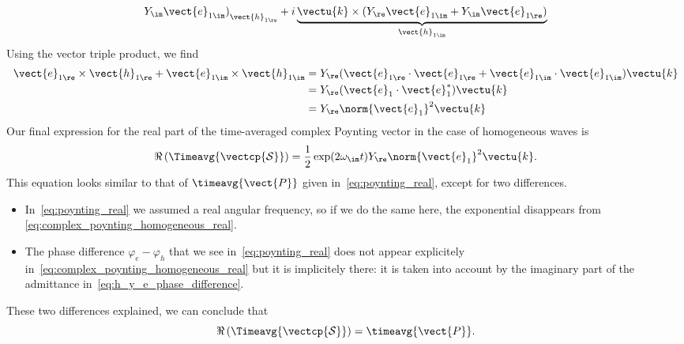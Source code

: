 \begin{refsection}
\begin{equation}
{                 Y_\im \vect{e}_{1\im})
               }_{\vect{h}_{1\re}}
    +i
    \underbrace{\vectu{k} \times
                (Y_\re \vect{e}_{1\im} +
                 Y_\im \vect{e}_{1\re})
               }_{\vect{h}_{1\im}}
    \label{eq:h_y_e_phase_difference}
\end{equation}
Using the vector triple product, we find
\begin{subequations}
\begin{align}
    \vect{e}_{1\re} \times \vect{h}_{1\re}
    +
    \vect{e}_{1\im} \times \vect{h}_{1\im}
    &=
    Y_\re (\vect{e}_{1\re} \cdot \vect{e}_{1\re} +
         \vect{e}_{1\im} \cdot \vect{e}_{1\im}) \vectu{k}
    \\
    &=
    Y_\re (\vect{e}_1 \cdot \vect{e}_1^*) \vectu{k}
    \\
    &=
    Y_\re \norm{\vect{e}_1}^2 \vectu{k}
\end{align}
\end{subequations}
Our final expression for the real part of the time-averaged complex Poynting vector in the case of homogeneous waves is
\begin{equation}
    \Re\left( \Timeavg{\vectcp{\mathcal{S}}} \right)
    =
    \frac{1}{2}
    \exp(2\omega_\im t)
    Y_\re %
    \norm{\vect{e}_1}^2
    \vectu{k}
    \text{.}
    \label{eq:complex_poynting_homogeneous_real}
\end{equation}
This equation looks similar to that of $\timeavg{\vect{P}}$ given in~\cref{eq:poynting_real}, except for two differences.
\begin{itemize}
    \item 
In~\cref{eq:poynting_real} we assumed a real angular frequency, so if we do the same here, the exponential disappears from \cref{eq:complex_poynting_homogeneous_real}.
    \item
The phase difference $\varphi_e-\varphi_h$ that we see in~\cref{eq:poynting_real} does not appear explicitely in~\cref{eq:complex_poynting_homogeneous_real} but it is implicitely there:
it is taken into account by the imaginary part of the admittance in~\cref{eq:h_y_e_phase_difference}.
\end{itemize}
These two differences explained, we can conclude that
\begin{equation}
    \Re\left( \Timeavg{\vectcp{\mathcal{S}}} \right) = \timeavg{\vect{P}}
    \text{.}
\end{equation}




\end{refsection}
